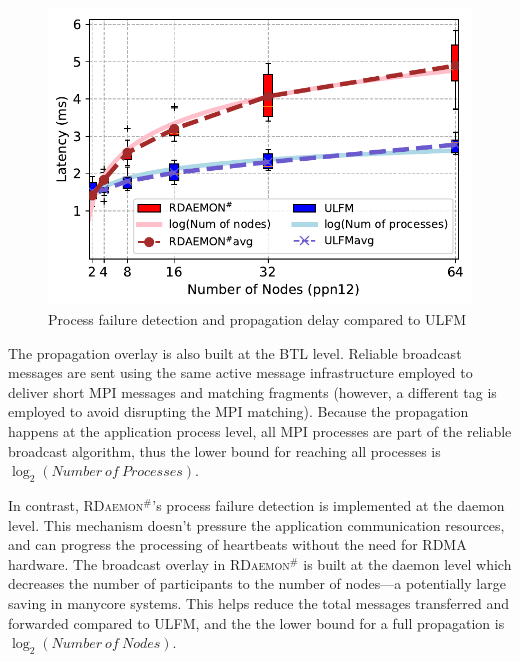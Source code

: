 \documentclass[sigconf]{acmart}
\newcommand{\ulfm}[0]{\textsc{ULFM}\xspace}
\newcommand{\mpi}[0]{\textsc{MPI}\xspace}
\newcommand{\ourwork}[0]{\textsc{RDaemon}\ensuremath{^\#}\xspace}
\begin{document}
\begin{figure}[h]
  \centering
  \includegraphics[width=\linewidth]{Process_Failure_log_fit.pdf}
  \caption{Process failure detection and propagation delay compared to \ulfm}
  \label{fig:proc_failure_nacl}
\end{figure}

The propagation overlay is also built at the BTL level. Reliable broadcast
messages are sent using the same active message infrastructure employed to
deliver short \mpi messages and matching fragments (however, a different
tag is employed to avoid disrupting the \mpi matching). Because the
propagation happens at the application process level, all \mpi processes
are part of the reliable broadcast algorithm, thus the lower bound for reaching
all processes is $\log_2({Number\ of\ Processes})$.

In contrast, \ourwork's process failure detection is implemented at the daemon
level. This mechanism doesn't pressure the application communication resources,
and can progress the processing of heartbeats without the need for
RDMA hardware. The broadcast overlay in \ourwork is built at the daemon
level which decreases the number of participants to the number of nodes---a potentially
large saving in manycore systems. This helps reduce
the total messages transferred and forwarded compared to \ulfm, and the
 the lower bound for a full propagation is $\log_2({Number\ of\ Nodes})$.
\end{document}
